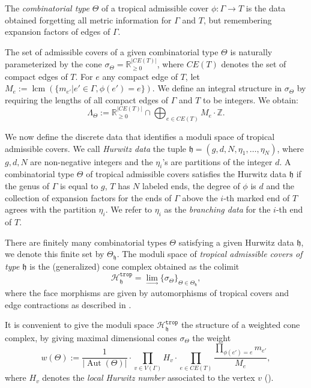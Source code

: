 \documentclass[11pt,reqno]{amsart}
\theoremstyle{definition}
\newcommand{\R}{\mathds{R}}
\newcommand{\Z}{\mathds{Z}}
\newcommand\trop{{\mathtt{trop}}}
\DeclareMathOperator{\Aut}{\mathrm Aut}
\DeclareMathOperator{\lcm}{lcm}
\newcommand\Hur[1]{\mathcal H_{#1}}
\begin{document}
The {\it combinatorial type} $\Theta$ of a tropical admissible cover $\phi:\Gamma \to T $ is the data obtained forgetting all metric information for $\Gamma$ and $T$, but remembering  expansion factors of edges of $\Gamma$.

The set of admissible covers of a given combinatorial type $\Theta$ is naturally parameterized by the cone $\sigma_\Theta = \R_{\ge 0}^{|CE(T)|}$, where $CE(T)$ denotes the set of compact edges of $T$. For $e$ any compact edge of $T$, let $M_e:=\lcm(\{m_{e'}| e'\in \Gamma, \phi(e')=e\})$.
We define an integral structure in $\sigma_\Theta$ by requiring the lengths of all compact edges of $\Gamma$ and $T$ to be integers. We obtain:
\begin{equation}
    \Lambda_\Theta:= \R_{\ge 0}^{|CE(T)|} \cap \bigoplus_{e\in CE(T)}M_e\cdot \Z.
\end{equation}

We now define the discrete data that identifies a moduli space of tropical admissible covers. We call {\it Hurwitz data} the tuple $\mathfrak{h} = (g,d,N, \eta_1, \ldots, \eta_N)$, where $g,d, N$ are non-negative integers and the $\eta_i$'s are partitions of the integer $d$. A combinatorial type $\Theta$  of tropical admissible covers satisfies the Hurwitz data $\mathfrak{h}$ if the genus of $\Gamma$ is equal to $g$, $T$ has $N$ labeled ends, the degree of $\phi$ is $d$ and the collection of expansion factors for the ends of $\Gamma$ above the $i$-th marked end of $T$ agrees with the partition $\eta_i$. We refer to $\eta_i$ as the {\it branching data} for the $i$-th end of $T$.

There are finitely many combinatorial types $\Theta$ satisfying a given Hurwitz data $\mathfrak{h}$, we denote this finite set by $\Theta_\mathfrak{h}$. The moduli space of {\it tropical admissible covers of type $\mathfrak{h}$} is the (generalized) cone complex obtained as the colimit 
\begin{equation}
    \Hur{\mathfrak{h}}^\trop = \lim_{\to} \{\sigma_\Theta\}_{\Theta \in \Theta_{\mathfrak{h}}},
\end{equation}
where the face morphisms are given by automorphisms of tropical covers and edge contractions as described in \cite[Section 3.2.5]{CMRadmissible}.

It is convenient to give the moduli space $\Hur{\mathfrak{h}}^\trop$ the structure of a weighted cone complex, by giving maximal dimensional cones $\sigma_\Theta$ the weight
\begin{equation}\label{def:weights}
    w(\Theta):= \frac{1}{|\Aut(\Theta)|}\cdot \prod_{v\in V(\Gamma)} H_v \cdot\prod_{e\in CE(T)}\frac{\prod_{\phi(e') = e}m_{e'}}{M_e},
\end{equation}
where $H_v$ denotes the {\it local Hurwitz number} associated to the vertex $v$ (\cite[Section 3.2.4]{CMRadmissible}).
\end{document}
